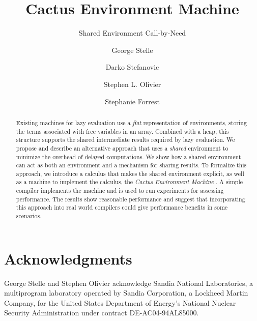 \documentclass{llncs}
\begin{document}
\title{Cactus Environment Machine}
\subtitle{Shared Environment Call-by-Need}

\author{George Stelle \and Darko Stefanovic 
        \and Stephen L. Olivier 
        \and Stephanie Forrest
        }
      

\maketitle

\begin{abstract}
Existing machines for lazy evaluation use a \emph{flat} representation of
environments, storing the terms associated with free variables in an array.
Combined with a heap, this structure supports the shared intermediate results
required by lazy evaluation.  We propose and describe an alternative
approach that uses a \emph{shared} environment to minimize the overhead of
delayed computations. We show how a shared environment can act as both an
environment and a mechanism for sharing results. To formalize this approach, we
introduce a calculus that makes the shared environment explicit, as well as
a machine to implement the calculus, the \emph{Cactus Environment Machine}
. A simple compiler implements the machine and is used to run experiments for
assessing performance. The results show reasonable performance and suggest that
incorporating this approach into real world compilers could give performance
benefits in some scenarios.
\end{abstract}












\section{Acknowledgments}
George Stelle and Stephen Olivier acknowledge Sandia National Laboratories, a
multiprogram laboratory operated by Sandia Corporation, a Lockheed Martin
Company, for the United States Department of Energy’s National Nuclear Security
Administration under contract DE-AC04-94AL85000.




% 
\end{document}
